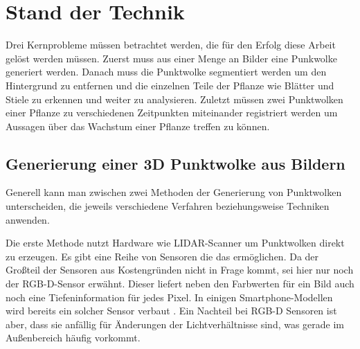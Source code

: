 \documentclass[12pt,titlepage, twoside]{article}
\begin{document}
\newpage
\section{Stand der Technik}
\label{sec:stand}
%

Drei Kernprobleme müssen betrachtet werden, die für den Erfolg diese Arbeit gelöst werden müssen. 
Zuerst muss aus einer Menge an Bilder eine Punkwolke generiert werden. Danach muss die Punktwolke segmentiert werden um den Hintergrund zu entfernen und die einzelnen Teile der Pflanze wie Blätter und Stiele zu erkennen und weiter zu analysieren. 
Zuletzt müssen zwei Punktwolken einer Pflanze zu verschiedenen Zeitpunkten miteinander registriert werden um Aussagen über das Wachstum einer Pflanze treffen zu können.

\subsection{Generierung einer 3D Punktwolke aus Bildern}
\label{sec:stand:pointcloud}

Generell kann man zwischen zwei Methoden der Generierung von Punktwolken unterscheiden, die jeweils verschiedene Verfahren beziehungsweise Techniken anwenden.

Die erste Methode nutzt Hardware wie LIDAR-Scanner \cite{lidar} um Punktwolken direkt zu erzeugen. Es gibt eine Reihe von Sensoren die das ermöglichen. 
Da der Großteil der Sensoren aus Kostengründen nicht in Frage kommt, sei hier nur noch der RGB-D-Sensor erwähnt. 
Dieser liefert neben den Farbwerten für ein Bild auch noch eine Tiefeninformation für jedes Pixel. In einigen Smartphone-Modellen wird bereits ein solcher Sensor verbaut \cite{rgbd_smartphones}.
Ein Nachteil bei RGB-D Sensoren ist aber, dass sie anfällig für Änderungen der Lichtverhältnisse sind, was gerade im Außenbereich häufig vorkommt.
\end{document}
